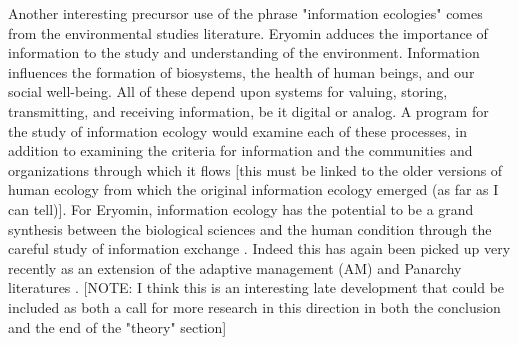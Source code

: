 Another interesting precursor use of the phrase "information ecologies" comes from the environmental studies literature. Eryomin adduces the importance of information to the study and understanding of the environment. Information influences the formation of biosystems, the health of human beings, and our social well-being. All of these depend upon systems for valuing, storing, transmitting, and receiving information, be it digital or analog. A program for the study of information ecology would examine each of these processes, in addition to examining the criteria for information and the communities and organizations through which it flows [this must be linked to the older versions of human ecology from which the original information ecology emerged (as far as I can tell)]. For Eryomin, information ecology has the potential to be a grand synthesis between the biological sciences and the human condition through the careful study of information exchange \citep{eryomin_information_1998}. Indeed this has again been picked up very recently as an extension of the adaptive management (AM) and Panarchy literatures \citep{eddy_information_2014}. [NOTE: I think this is an interesting late development that could be included as both a call for more research in this direction in both the conclusion and the end of the "theory" section]